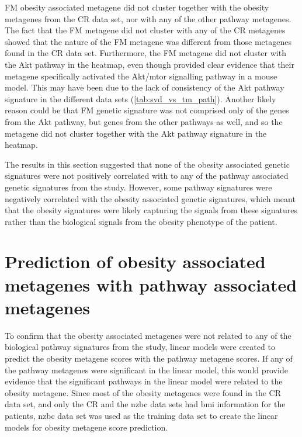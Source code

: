 FM obesity associated metagene did not cluster together with the obesity metagenes from the CR data set, nor with any of the other pathway metagenes.
The fact that the FM metagene did not cluster with any of the CR metagenes showed that the nature of the FM metagene was different from those metagenes found in the CR data set.
Furthermore, the FM metagene did not cluster with the Akt pathway in the heatmap, even though \citet{Fuentes-Mattei2014} provided clear evidence that their metagene specifically activated the Akt/\gls{mtor} signalling pathway in a mouse model.
This may have been due to the lack of consistency of the Akt pathway signature in the different data sets (\cref{tab:svd_vs_tm_path}).
Another likely reason could be that FM genetic signature was not comprised only of the genes from the Akt pathway, but genes from the other pathways as well, and so the metagene did not cluster together with the Akt pathway signature in the heatmap.

The results in this section suggested that none of the obesity associated genetic signatures were not positively correlated with to any of the pathway associated genetic signatures from the \citet{Gatza2010a} study.
However, some pathway signatures were negatively correlated with the obesity associated genetic signatures, which meant that the obesity signatures were likely capturing the signals from these signatures  rather than the biological signals from the obesity phenotype of the patient.

\section{Prediction of obesity associated metagenes with pathway associated metagenes}
\label{sec:prediction_of_obesity_associated_metagene_with_pathway_associate_metagene}

To confirm that the obesity associated metagenes were not related to any of the biological pathway signatures from the \citet{Gatza2010a} study, linear models were created to predict the obesity metagene scores with the pathway metagene scores.
If any of the pathway metagenes were significant in the linear model, this would provide evidence that the significant pathways in the linear model were related to the obesity metagene.
Since most of the obesity metagenes were found in the CR data set, and only the CR and the \gls{nzbc} data sets had \gls{bmi} information for the patients, \gls{nzbc} data set was used as the training data set to create the linear models for obesity metagene score prediction.

